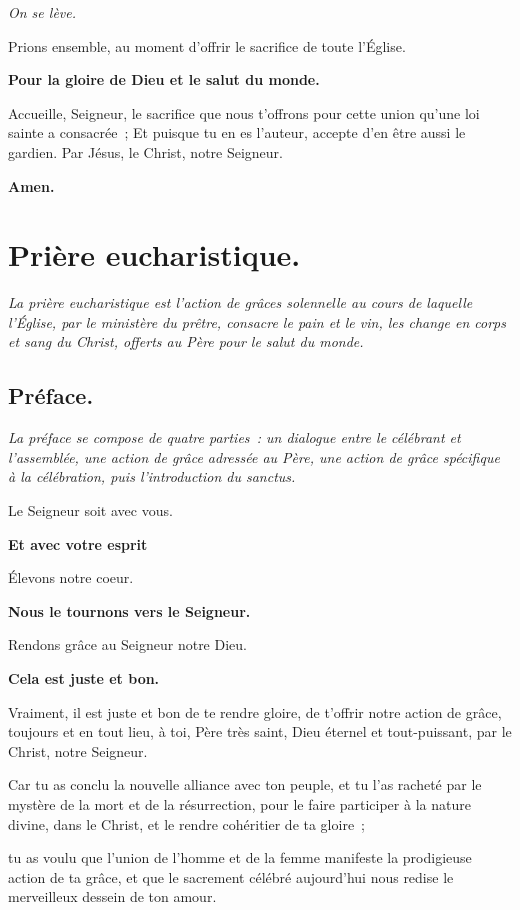 \emph{On se lève.}

Prions ensemble, au moment d'offrir le sacrifice de toute l'Église.

{\bf Pour la gloire de Dieu et le salut du monde.}


Accueille, Seigneur, le sacrifice que nous t'offrons
pour cette union qu'une loi sainte a consacrée~;
Et puisque tu en es l'auteur,
accepte d'en être aussi le gardien.
Par Jésus, le Christ, notre Seigneur.

{\bf Amen.}


\section*{Prière eucharistique.}

\emph{La prière eucharistique est l'action de grâces solennelle au              
cours de laquelle l'Église, par le ministère du prêtre, consacre le             
pain et le vin, les change en corps et sang du Christ, offerts au Père          
pour le salut du monde.}


\subsection*{Préface.}
\emph{La préface se compose de quatre parties~: un dialogue entre le            
célébrant et l'assemblée, une action de grâce adressée au Père, une             
action de grâce spécifique à la célébration, puis
l'introduction du sanctus.}

Le Seigneur soit avec vous.

{\bf Et avec votre esprit}

Élevons notre coeur.

{\bf Nous le tournons vers le Seigneur.}

Rendons grâce au Seigneur notre Dieu.

{\bf Cela est juste et bon.}

Vraiment, il est juste et bon de te rendre gloire, de t'offrir notre
action de grâce, toujours et en tout lieu, à toi, Père très saint,
Dieu éternel et tout-puissant, par le Christ, notre Seigneur.

Car tu as conclu la nouvelle alliance avec ton peuple, et tu l'as
racheté par le mystère de la mort et de la résurrection, pour le faire
participer à la nature divine, dans le Christ, et le rendre cohéritier
de ta gloire~;

tu as voulu que l'union de l'homme et de la femme manifeste la
prodigieuse action de ta grâce, et que le sacrement célébré
aujourd'hui nous redise le merveilleux dessein de ton amour.

